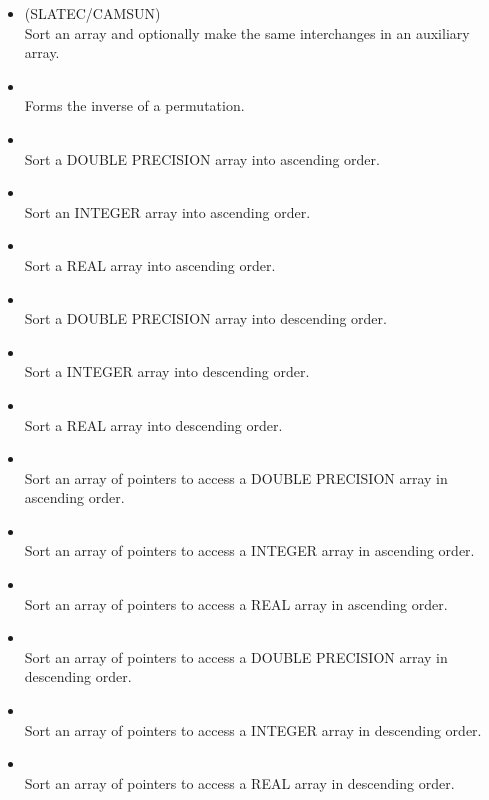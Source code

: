 \documentclass[11pt,twoside,nolof]{starlink}
\begin{document}
\begin{itemize}

\item {} (SLATEC/CAMSUN)\\
   Sort an array and optionally make the same interchanges in
   an auxiliary array.

\item {}\\
   Forms the inverse of a permutation.

\item {}\\
   Sort a DOUBLE PRECISION array into ascending order.
\item {}\\
   Sort an INTEGER array into ascending order.
\item {}\\
   Sort a REAL array into ascending order.
\item {}\\
   Sort a DOUBLE PRECISION array into descending order.
\item {}\\
   Sort a INTEGER array into descending order.
\item {}\\
   Sort a REAL array into descending order.
\item {}\\
   Sort an array of pointers to access a DOUBLE PRECISION array
   in ascending order.
\item {}\\
   Sort an array of pointers to access a INTEGER array
   in ascending order.
\item {}\\
   Sort an array of pointers to access a REAL array
   in ascending order.
\item {}\\
   Sort an array of pointers to access a DOUBLE PRECISION array in
   descending order.
\item {}\\
   Sort an array of pointers to access a INTEGER array in
   descending order.
\item {}\\
   Sort an array of pointers to access a REAL array in
   descending order.


\end{itemize}
\end{document}

